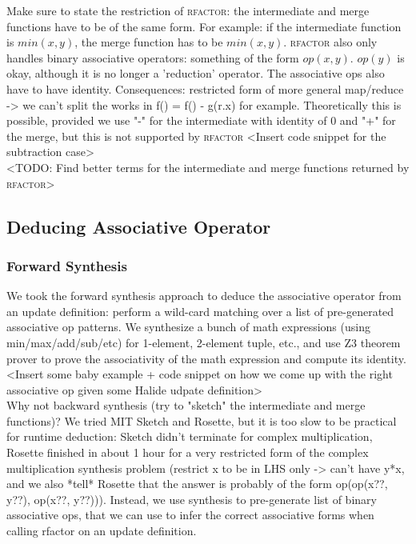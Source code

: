 Make sure to state the restriction of \textsc{rfactor}: the intermediate and merge functions have to be of the same form. For example: if the intermediate function is $min(x, y)$, the merge function has to be $min(x, y)$. \textsc{rfactor} also only handles binary associative operators: something of the form $op(x, y)$. $op(y)$ is okay, although it is no longer a 'reduction' operator. The associative ops also have to have identity. Consequences: restricted form of more general map/reduce -> we can't split the works in f() = f() -  g(r.x) for example. Theoretically this is possible, provided we use "-" for the intermediate with identity of 0 and "+" for the merge, but this is not supported by \textsc{rfactor} <Insert code snippet for the subtraction case> \\

<TODO: Find better terms for the intermediate and merge functions returned by \textsc{rfactor}> \\

\subsection{Deducing Associative Operator}

\subsubsection{Forward Synthesis}

We took the forward synthesis approach to deduce the associative operator from an update definition: perform a wild-card matching over a list of pre-generated associative op patterns. We synthesize a bunch of math expressions (using min/max/add/sub/etc) for 1-element, 2-element tuple, etc., and use Z3 theorem prover \cite{DeMoura:2008:ZES:1792734.1792766} to prove the associativity of the math expression and compute its identity. \\

<Insert some baby example + code snippet on how we come up with the right associative op given some Halide udpate definition> \\

Why not backward synthesis (try to "sketch" the intermediate and merge functions)? We tried MIT Sketch and Rosette, but it is too slow to be practical for runtime deduction: Sketch didn't terminate for complex multiplication, Rosette finished in about 1 hour for a very restricted form of the complex multiplication synthesis problem (restrict x to be in LHS only -> can't have y*x, and we also *tell* Rosette that the answer is probably of the form op(op(x??, y??), op(x??, y??))). Instead, we use synthesis to pre-generate list of binary associative ops, that we can use to infer the correct associative forms when calling rfactor on an update definition. \\

